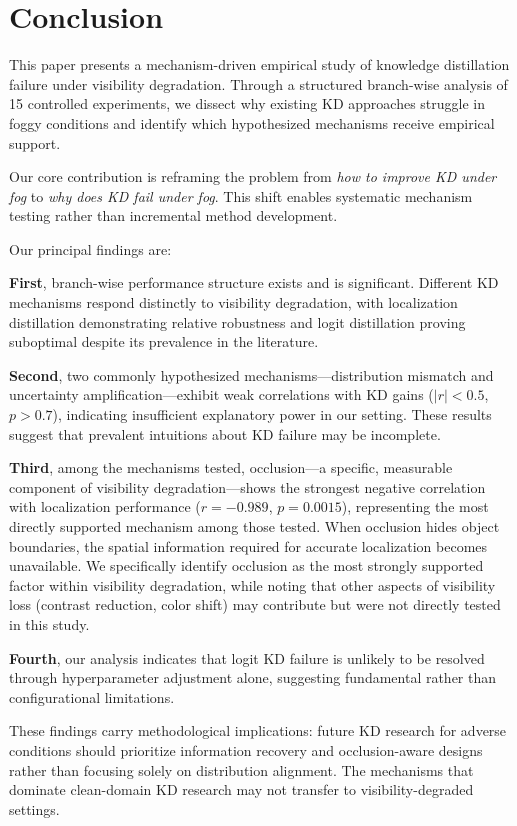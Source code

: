\section{Conclusion}
\label{sec:conclusion}

This paper presents a mechanism-driven empirical study of knowledge distillation failure under visibility degradation. Through a structured branch-wise analysis of 15 controlled experiments, we dissect why existing KD approaches struggle in foggy conditions and identify which hypothesized mechanisms receive empirical support.

Our core contribution is reframing the problem from \emph{how to improve KD under fog} to \emph{why does KD fail under fog}. This shift enables systematic mechanism testing rather than incremental method development.

Our principal findings are:

\textbf{First}, branch-wise performance structure exists and is significant. Different KD mechanisms respond distinctly to visibility degradation, with localization distillation demonstrating relative robustness and logit distillation proving suboptimal despite its prevalence in the literature.

\textbf{Second}, two commonly hypothesized mechanisms---distribution mismatch and uncertainty amplification---exhibit weak correlations with KD gains ($|r| < 0.5$, $p > 0.7$), indicating insufficient explanatory power in our setting. These results suggest that prevalent intuitions about KD failure may be incomplete.

\textbf{Third}, among the mechanisms tested, occlusion---a specific, measurable component of visibility degradation---shows the strongest negative correlation with localization performance ($r = -0.989$, $p = 0.0015$), representing the most directly supported mechanism among those tested. When occlusion hides object boundaries, the spatial information required for accurate localization becomes unavailable. We specifically identify occlusion as the most strongly supported factor within visibility degradation, while noting that other aspects of visibility loss (contrast reduction, color shift) may contribute but were not directly tested in this study.

\textbf{Fourth}, our analysis indicates that logit KD failure is unlikely to be resolved through hyperparameter adjustment alone, suggesting fundamental rather than configurational limitations.

These findings carry methodological implications: future KD research for adverse conditions should prioritize information recovery and occlusion-aware designs rather than focusing solely on distribution alignment. The mechanisms that dominate clean-domain KD research may not transfer to visibility-degraded settings.

